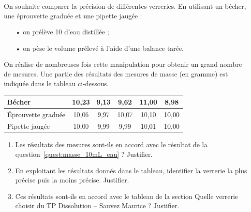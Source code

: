 On souhaite comparer la précision de différentes verreries.
En utilisant un bécher, une éprouvette graduée et une pipette jaugée :
\begin{itemize}
\item[•] on prélève \unit{10}{\milli\liter} d'eau distillée ;
\item[•] on pèse le volume prélevé à l'aide d'une balance tarée.
\end{itemize}
On réalise de nombreuses fois cette manipulation pour obtenir un grand nombre de mesures.
Une partie des résultats des mesures de masse (en gramme) est indiquée dans le tableau ci-dessous.
\begin{center}
\begin{tabular}{l|c|c|c|c|c}
Bécher & 10{,}23 & 9{,}13 & 9{,}62 & 11{,}00 & 8{,}98 \\
\hline
Éprouvette graduée & 10{,}06 & 9{,}97 & 10{,}07 & 10{,}10 & 10{,}00 \\
\hline
Pipette jaugée & 10{,}00 & 9{,}99 & 9{,}99 & 10{,}01 & 10{,}00 \\
\end{tabular}
\end{center}
\begin{enumerate}[resume]
\item Les résultats des mesures sont-ils en accord avec le résultat de la question~\ref{quest:masse_10mL_eau} ?
Justifier.
\item En exploitant les résultats donnés dans le tableau, identifier la verrerie la plus précise puis la moins précise.
Justifier.
\item Ces résultats sont-ils en accord avec le tableau de la section \og Quelle verrerie choisir \fg{}  du TP Dissolution -- Sauvez Maurice ?
Justifier.
\end{enumerate}

